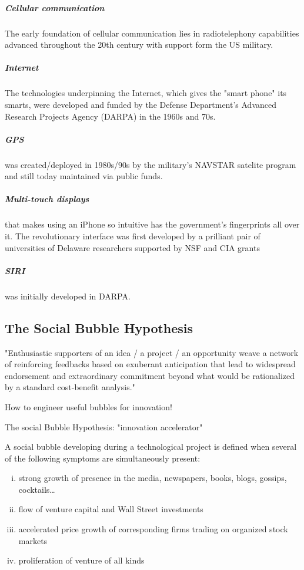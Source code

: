 \subparagraph{Cellular communication} The early foundation of cellular
communication lies in radiotelephony capabilities advanced throughout the 20th
century with support form the US military.

\subparagraph{Internet} The technologies underpinning the Internet, which gives
the "smart phone" its smarts, were developed and funded by the Defense Department's
Advanced Research Projects Agency (DARPA) in the 1960s and 70s.

\subparagraph{GPS} was created/deployed in 1980s/90s by the military's
NAVSTAR satelite program and still today maintained via public funds.

\subparagraph{Multi-touch displays} that makes using an iPhone so intuitive has
the government's fingerprints all over it. The revolutionary interface was first
developed by a prilliant pair of universities of Delaware researchers supported
by NSF and CIA grants

\subparagraph{SIRI} was initially developed in DARPA.


\subsection{The Social Bubble Hypothesis}

"Enthusiastic supporters of an idea / a project / an opportunity weave a network
of reinforcing feedbacks based on exuberant anticipation that lead to widespread
endorsement and extraordinary commitment beyond what would be rationalized by a
standard cost-benefit analysis."

\vspace{1\baselineskip}

How to engineer useful bubbles for innovation!

\vspace{1\baselineskip}

The social Bubble Hypothesis: "innovation accelerator"

\begin{definition}
    A social bubble developing during a technological project is defined when
    several of the following symptoms are simultaneously present:
    \begin{enumerate}[(i)]
        \item strong growth of presence in the media, newspapers, books,
            blogs, gossips, cocktails\dots
        \item flow of venture capital and Wall Street investments
        \item accelerated price growth of corresponding firms trading on
            organized stock markets
        \item proliferation of venture of all kinds
    \end{enumerate}
\end{definition}


